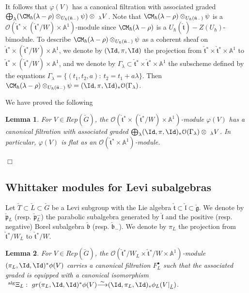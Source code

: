 \documentclass[11pt]{amsart}
\newtheorem{lem}{Lemma}
\theoremstyle{definition}
\theoremstyle{remark}
\renewcommand{\O}{{\mathcal O}}
\theoremstyle{remark}
\newcommand{\cal}{\mathcal}
\newcommand{\iso}{{\stackrel{\sim}{\longrightarrow}}}
\newcommand{\<}{\langle}
\renewcommand{\>}{\rangle}
\newcommand{\Lg}{\check{\mathfrak g}{}}
\newcommand{\Ll}{\check{\mathfrak l}{}}
\newcommand{\Ln}{\check{\mathfrak n}{}}
\newcommand{\Lp}{\check{\mathfrak p}{}}
\newcommand{\Lt}{\check{\mathfrak t}{}}
\newcommand{\Lb}{\check{\mathfrak b}{}}
\newcommand{\LG}{{\check{G}}}
\newcommand{\LL}{\check{L}{}}
\newcommand{\LT}{\check{T}{}}
\renewcommand{\O}{{\cal O}}
\newcommand{\Aone}{{\mathbb A}^1}
\begin{document}
It follows that $\varphi(V)$ has a canonical filtration with associated
graded $\bigoplus_\lambda
(\CM_\hbar(\lambda-\rho)\otimes_{U_\hbar(\Ln_-)}\psi)\otimes\ _\lambda V$.
Note that $\CM_\hbar(\lambda-\rho)\otimes_{U_\hbar(\Ln_-)}\psi$ is a
$\O(\Lt^*\times(\Lt^*/W)\times\Aone)$-module since
$\CM_\hbar(\lambda-\rho)$ is a $U_\hbar(\Lt)-Z(U_\hbar)$-bimodule.
To describe $\CM_\hbar(\lambda-\rho)\otimes_{U_\hbar(\Ln_-)}\psi$ as a coherent
sheaf on $\Lt^*\times(\Lt^*/W)\times\Aone$, we denote by 
$(\Id,\pi,\Id)$ the projection from $\Lt^*\times\Lt^*\times\Aone$ to
$\Lt^*\times(\Lt^*/W)\times\Aone$, and we denote by 
$\Gamma_\lambda\subset
\Lt^*\times\Lt^*\times\Aone$ the subscheme defined by the equations
$\Gamma_\lambda=\{(t_1,t_2,a):\ t_2=t_1+a\lambda\}$. Then 
$\CM_\hbar(\lambda-\rho)\otimes_{U_\hbar(\Ln_-)}\psi=
(\Id,\pi,\Id)_*\O(\Gamma_\lambda)$.

We have proved the following 

\begin{lem}
\label{Mit}
For $V\in Rep(\LG)$, the $\O(\Lt^*\times(\Lt^*/W)\times\Aone)$-module
$\varphi(V)$ has a canonical filtration with associated graded
$\bigoplus_\lambda
(\Id,\pi,\Id)_*\O(\Gamma_\lambda)\otimes\ _\lambda V$.
In particular, $\varphi(V)$ is flat as an $\O(\Lt^*\times\Aone)$-module.
\end{lem}
\hfill $\Box$


\subsection{Whittaker modules for Levi subalgebras}
Let $\LT\subset\LL\subset\LG$ be a Levi subgroup with the Lie algebra
$\Lt\subset\Ll\subset\Lg$. We denote by $\Lp_L$ (resp. $\Lp_L^-$) the 
parabolic subalgebra generated by $\Ll$ and the positive (resp. negative)
Borel subalgebra $\Lb$ (resp. $\Lb_-$). We denote by $\pi_L$ the 
projection from $\Lt^*/W_L$ to $\Lt^*/W$. 



\begin{lem}
\label{Eugene}
For $V\in Rep(\LG)$, the $\O(\Lt^*/W_L\times\Lt^*/W\times\Aone)$-module
$(\pi_L,\Id,\Id)^*\phi(V)$ 
carries a canonical filtration $F^\bullet_L$ such that the associated graded is
equipped with a canonical isomorphism
$\ ^{\operatorname{alg}}\Xi_L:\ gr(\pi_L,\Id,\Id)^*\phi(V)\iso(\Id,\pi_L,\Id)_*\phi_L(V|_{\LL})$.
\end{lem}
\end{document}
